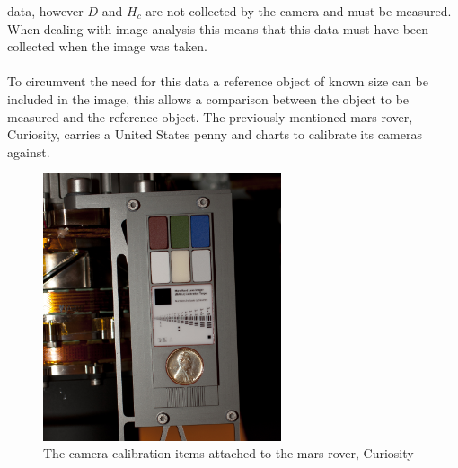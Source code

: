 	data, however $D$ and $H_{c}$ are not collected by the camera and must be measured. When 
	dealing with image analysis this means that this data must have been collected when the image 
	was taken.
	\\\\
	To circumvent the need for this data a reference object of known size can be included in the 
	image, this allows a comparison between the object to be measured and the reference object. The 
	previously mentioned mars rover, Curiosity, carries a United States penny and charts to 
	calibrate its cameras against.
	\begin{figure}[h!]
		\centering
		\includegraphics[width=7cm]{../images/curiosity_calibration_chart.jpg}
		\caption{The camera calibration items attached to the mars rover, Curiosity}
		\label{fig:curiosity_calibration_chart}
	\end{figure} 